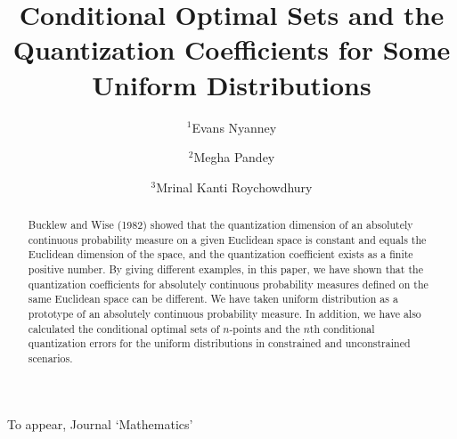 \documentclass[12pt, reqno]{amsart}
\theoremstyle{plain}
\theoremstyle{definition}
\begin{document}
To appear, Journal `Mathematics'
\title{Conditional Optimal Sets and the Quantization Coefficients for Some Uniform Distributions}


\address{$^{2}$School of Mathematics \\
	Northwest University Xi'an\\
	Shaanxi Province, 710069, China.}
\address{$^{1, 3}$School of Mathematical and Statistical Sciences\\
University of Texas Rio Grande Valley\\
1201 West University Drive\\
Edinburg, TX 78539-2999, USA.}

 
\author{$^1$Evans Nyanney}
\author{$^2$Megha Pandey}
 \author{$^3$Mrinal Kanti Roychowdhury}



%



\date{}
\maketitle
%
 \pagestyle{myheadings}


\begin{abstract}
Bucklew and Wise (1982) showed that the quantization dimension of an absolutely continuous probability measure on a given Euclidean space is constant and equals the Euclidean dimension of the space, and the quantization coefficient exists as a finite positive number.  By giving different examples, in this paper, we have shown that the quantization coefficients for absolutely continuous probability measures defined on the same Euclidean space can be different. We have taken uniform distribution as a prototype of an absolutely continuous probability measure. In addition, we have also calculated the conditional optimal sets of $n$-points and the $n$th conditional quantization errors for the uniform distributions in constrained and unconstrained scenarios. 
\end{abstract} 
\end{document}

